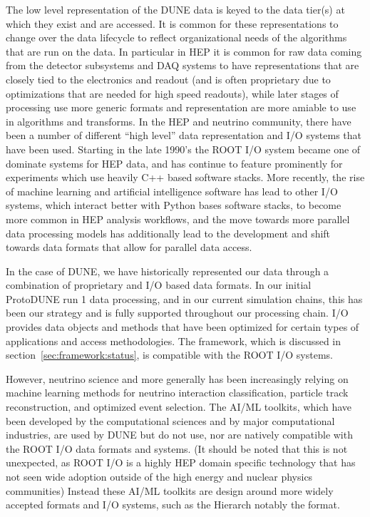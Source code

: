 \documentclass[../main-v1.tex]{subfiles}
\begin{document}
The low level representation of the DUNE data is keyed to the data tier(s) at which they exist and are accessed.  It is common for these representations to change over the data lifecycle to reflect organizational needs of the algorithms that are run on the data.  In particular in HEP it is common for raw data coming from the detector subsystems and DAQ systems to have representations that are closely tied to the electronics and readout (and is often proprietary due to optimizations that are needed for high speed readouts), while later stages of processing use more generic formats and representation are more amiable to use in algorithms and transforms.  In the HEP and neutrino community, there have been a number of different ``high level'' data representation and I/O systems that have been used.  Starting in the late 1990's the ROOT I/O system became one of dominate systems for HEP data, and has continue to feature prominently for experiments which use heavily C++ based software stacks.  More recently, the rise of machine learning and artificial intelligence software has lead to other I/O systems, which interact better with Python bases software stacks, to become more common in HEP analysis workflows, and the move towards more parallel data processing models has additionally lead to the development and shift towards data formats that allow for parallel data access.

In the case of DUNE, we have historically represented our data through a combination of proprietary and  I/O based data formats.  In our initial ProtoDUNE run 1 data processing, and in our current simulation chains, this has been our strategy and is fully supported throughout our processing chain.   I/O provides data objects and methods that have been optimized for certain types of  applications and access methodologies.  The  framework, which is discussed in section~\ref{sec:framework:status}, is compatible with the ROOT I/O systems.

However, neutrino science and  more generally has been increasingly relying on machine learning methods for neutrino interaction classification, particle track reconstruction, and optimized event selection.  The AI/ML toolkits, which have been developed by the computational sciences and by major computational industries, are used by DUNE but do not use, nor are natively compatible with the ROOT I/O data formats and systems.  (It should be noted that this is not unexpected, as ROOT I/O is a highly HEP domain specific technology that has not seen wide adoption outside of the high energy and nuclear physics communities) Instead these AI/ML toolkits are design around more widely accepted formats and I/O systems, such as the Hierarch notably the  format.
\end{document}
